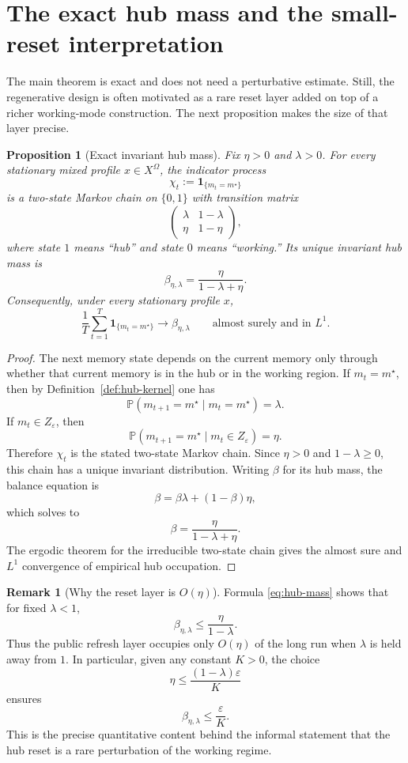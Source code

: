 \documentclass[11pt]{article}
\newtheorem{proposition}[theorem]{Proposition}
\theoremstyle{definition}
\newtheorem{remark}[theorem]{Remark}
\newcommand{\Prob}{\mathbb{P}}
\newcommand{\1}{\mathbf{1}}
\begin{document}
\section{The exact hub mass and the small-reset interpretation}\label{sec:hub-mass}

The main theorem is exact and does not need a perturbative estimate. Still, the regenerative design is often motivated as a rare reset layer added on top of a richer working-mode construction. The next proposition makes the size of that layer precise.

\begin{proposition}[Exact invariant hub mass]\label{prop:hub-mass}
Fix $\eta>0$ and $\lambda>0$. For every stationary mixed profile $x\in X^\Omega$, the indicator process
\[
\chi_t:=\1_{\{m_t=m^\star\}}
\]
is a two-state Markov chain on $\{0,1\}$ with transition matrix
\[
\begin{pmatrix}
\lambda & 1-\lambda\\
\eta & 1-\eta
\end{pmatrix},
\]
where state $1$ means ``hub'' and state $0$ means ``working.'' Its unique invariant hub mass is
\begin{equation}\label{eq:hub-mass}
\beta_{\eta,\lambda}=\frac{\eta}{1-\lambda+\eta}.
\end{equation}
Consequently, under every stationary profile $x$,
\[
\frac1T\sum_{t=1}^{T}\1_{\{m_t=m^\star\}}
\longrightarrow \beta_{\eta,\lambda}
\qquad\text{almost surely and in }L^1.
\]
\end{proposition}

\begin{proof}
The next memory state depends on the current memory only through whether that current memory is in the hub or in the working region. If $m_t=m^\star$, then by Definition~\ref{def:hub-kernel} one has
\[
\Prob(m_{t+1}=m^\star\mid m_t=m^\star)=\lambda.
\]
If $m_t\in Z_\varepsilon$, then
\[
\Prob(m_{t+1}=m^\star\mid m_t\in Z_\varepsilon)=\eta.
\]
Therefore $\chi_t$ is the stated two-state Markov chain. Since $\eta>0$ and $1-\lambda\ge0$, this chain has a unique invariant distribution. Writing $\beta$ for its hub mass, the balance equation is
\[
\beta=\beta\lambda+(1-\beta)\eta,
\]
which solves to
\[
\beta=\frac{\eta}{1-\lambda+\eta}.
\]
The ergodic theorem for the irreducible two-state chain gives the almost sure and $L^1$ convergence of empirical hub occupation.
\end{proof}

\begin{remark}[Why the reset layer is $O(\eta)$]\label{rem:hub-perturbation}
Formula \eqref{eq:hub-mass} shows that for fixed $\lambda<1$,
\[
\beta_{\eta,\lambda}\le \frac{\eta}{1-\lambda}.
\]
Thus the public refresh layer occupies only $O(\eta)$ of the long run when $\lambda$ is held away from $1$. In particular, given any constant $K>0$, the choice
\[
\eta\le \frac{(1-\lambda)\varepsilon}{K}
\]
ensures
\[
\beta_{\eta,\lambda}\le \frac{\varepsilon}{K}.
\]
This is the precise quantitative content behind the informal statement that the hub reset is a rare perturbation of the working regime.
\end{remark}
\end{document}
